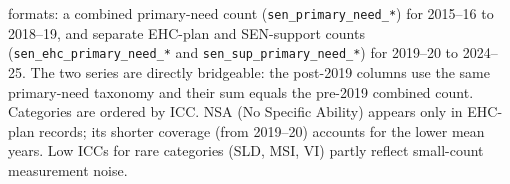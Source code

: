 \begin{table}[htb]
\begin{minipage}{\linewidth}
formats: a combined primary-need count (\texttt{sen\_primary\_need\_*}) for 2015--16 to 2018--19,
and separate EHC-plan and SEN-support counts (\texttt{sen\_ehc\_primary\_need\_*} and
\texttt{sen\_sup\_primary\_need\_*}) for 2019--20 to 2024--25. The two series are directly
bridgeable: the post-2019 columns use the same primary-need taxonomy and their sum equals the
pre-2019 combined count. Categories are ordered by ICC. NSA (No Specific Ability) appears only in
EHC-plan records; its shorter coverage (from 2019--20) accounts for the lower mean years. Low ICCs
for rare categories (SLD, MSI, VI) partly reflect small-count measurement noise.
\end{minipage}
\end{table}
